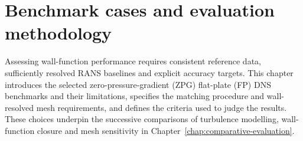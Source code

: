 \chapter{Benchmark cases and evaluation methodology}
\label{chap:evaluation-methodology}
Assessing wall-function performance requires consistent reference data, sufficiently resolved RANS baselines and explicit accuracy targets. This chapter introduces the selected zero-pressure-gradient (ZPG) flat-plate (FP) DNS benchmarks and their limitations, specifies the matching procedure and wall-resolved mesh requirements, and defines the criteria used to judge the results. These choices underpin the successive comparisons of turbulence modelling, wall-function closure and mesh sensitivity in Chapter~\ref{chap:comparative-evaluation}.




